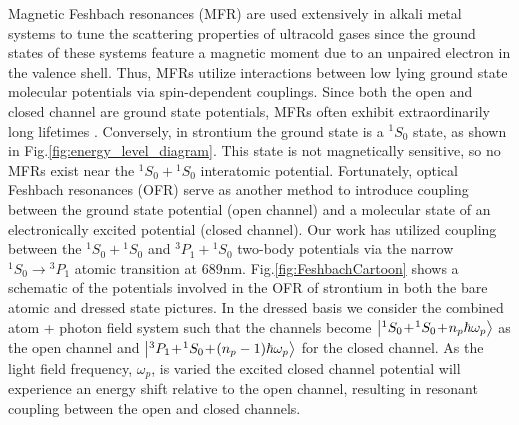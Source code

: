 Magnetic Feshbach resonances (MFR) are used extensively in alkali metal systems to tune the scattering properties of ultracold gases since the ground states of these systems feature a magnetic moment due to an unpaired electron in the valence shell. Thus, MFRs utilize interactions between low lying ground state molecular potentials via spin-dependent couplings. Since both the open and closed channel are ground state potentials, MFRs often exhibit extraordinarily long lifetimes \cite{Chin2010,Kohler2006}. Conversely, in strontium the ground state is a $^1S_0$ state, as shown in Fig.\;\ref{fig:energy_level_diagram}. This state is not magnetically sensitive, so no MFRs exist near the $^1S_0\!+\!^1S_0$ interatomic potential. Fortunately, optical Feshbach resonances (OFR) serve as another method to introduce coupling between the ground state potential (open channel) and a molecular state of an electronically excited potential (closed channel). Our work has utilized coupling between the $^1S_0\!+\!^1S_0$ and  $^3P_1\!+\!^1S_0$ two-body potentials via the narrow $^1S_0\!\rightarrow\!^3P_1$ atomic transition at 689nm. Fig.\;\ref{fig:FeshbachCartoon} shows a schematic of the potentials involved in the OFR of strontium in both the bare atomic and dressed state pictures. In the dressed basis we consider the combined atom + photon field system such that the channels become $\left| {^1S_0\!+\!^1S_0\!+\!n_p\hbar\omega_p} \right>$ as the open channel and $\left| {^3P_1\!+\!^1S_0\!+\!(n_p-1)\hbar\omega_p} \right>$ for the closed channel. As the light field frequency, $\omega_p$, is varied the excited closed channel potential will experience an energy shift relative to the open channel, resulting in resonant coupling between the open and closed channels. \cite{Ciuryo2005,Bohn1997,Fedichev1996a}

